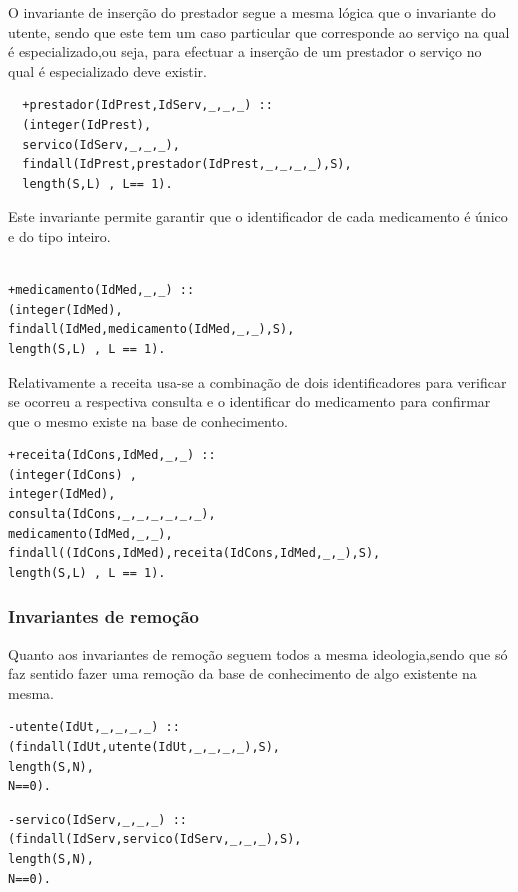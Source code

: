 \documentclass[25pt]{article}
\begin{document}
O invariante de inserção do prestador segue a mesma lógica que o invariante do utente, sendo que este tem um caso particular que corresponde ao serviço na qual é especializado,ou seja, para efectuar a inserção de um prestador o serviço no qual é especializado  deve existir.\\
\begin{lstlisting}
  +prestador(IdPrest,IdServ,_,_,_) ::
  (integer(IdPrest),
  servico(IdServ,_,_,_),
  findall(IdPrest,prestador(IdPrest,_,_,_,_),S),
  length(S,L) , L== 1).
\end{lstlisting}



Este invariante permite garantir que o identificador de cada medicamento é  único e do tipo inteiro.\\
\begin{lstlisting}

+medicamento(IdMed,_,_) ::
(integer(IdMed),
findall(IdMed,medicamento(IdMed,_,_),S),
length(S,L) , L == 1).
\end{lstlisting}


Relativamente a receita usa-se a combinação de dois identificadores para verificar se ocorreu a respectiva consulta e o identificar do medicamento
para confirmar que o mesmo existe na base de conhecimento.
\begin{lstlisting}
+receita(IdCons,IdMed,_,_) ::
(integer(IdCons) ,
integer(IdMed),
consulta(IdCons,_,_,_,_,_,_),
medicamento(IdMed,_,_),
findall((IdCons,IdMed),receita(IdCons,IdMed,_,_),S),
length(S,L) , L == 1).
\end{lstlisting}




\subsubsection{Invariantes de remoção}

Quanto aos invariantes de remoção  seguem todos a mesma ideologia,sendo que só faz sentido fazer uma remoção da base de conhecimento de algo existente na mesma.

\begin{lstlisting}
-utente(IdUt,_,_,_,_) ::
(findall(IdUt,utente(IdUt,_,_,_,_),S),
length(S,N),
N==0).
\end{lstlisting}

\begin{lstlisting}
-servico(IdServ,_,_,_) ::
(findall(IdServ,servico(IdServ,_,_,_),S),
length(S,N),
N==0).
\end{lstlisting}
\end{document}
